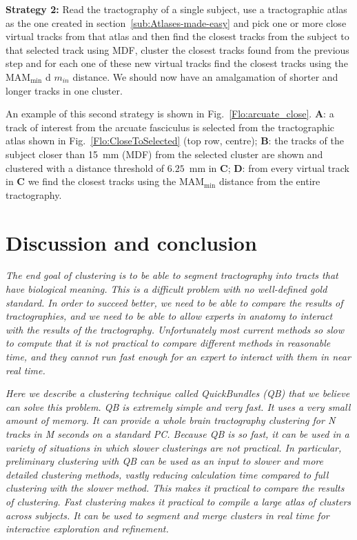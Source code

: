 \documentclass[journal]{IEEEtran}
\begin{document}
\textbf{Strategy 2:} Read the tractography of a single subject, use a
tractographic atlas as the one created in
section~\ref{sub:Atlases-made-easy} and pick one or more close virtual
tracks from that atlas and then find the closest tracks from the subject
to that selected track using MDF, cluster the closest tracks found
from the previous step and for each one of these new virtual tracks find
the closest tracks using the $\textrm{MAM}_{\textrm{min}}$ d $m_{in}$ distance. We should now have an
amalgamation of shorter and longer tracks in one cluster.

An example of this second strategy is shown in
Fig.~\ref{Flo:arcuate_close}. \textbf{A}: a track of interest from the arcuate
fasciculus is selected from the tractographic atlas shown in
Fig.~\ref{Flo:CloseToSelected} (top row, centre); \textbf{B}: the tracks of the
subject closer than 15~mm (MDF) from the selected cluster are shown
and clustered with a distance threshold of $6.25$~mm in \textbf{C}; \textbf{D}: from
every virtual track in \textbf{C} we find the closest tracks using the
$\textrm{MAM}_{\textrm{min}}$ distance from the entire tractography.

\section{Discussion and conclusion}

\textit{
The end goal of clustering is to be able to segment tractography into
tracts that have biological meaning.  This is a difficult problem with
no well-defined gold standard.  In order to succeed better, we need to
be able to compare the results of tractographies, and we need to be
able to allow experts in anatomy to interact with the results of the
tractography.  Unfortunately most current methods so slow to compute
that it is not practical to compare different methods in reasonable
time, and they cannot run fast enough for an expert to interact with
them in near real time.}

\textit{
Here we describe a clustering technique called QuickBundles (QB) that
we believe can solve this problem.   QB is extremely simple and very
fast.  It uses a very small amount of memory.  It can provide a whole
brain tractography clustering for N tracks in M seconds on a standard
PC.  Because QB is so fast, it can be used in a variety of situations
in which slower clusterings are not practical.  In particular,
preliminary clustering with QB can be used as an input to slower and
more detailed clustering methods, vastly reducing calculation time
compared to full clustering with the slower method.  This makes it
practical to compare the results of clustering.  Fast clustering makes
it practical to compile a large atlas of clusters across subjects.  It
can be used to segment and merge clusters in real time for interactive
exploration and refinement.}
\end{document}
